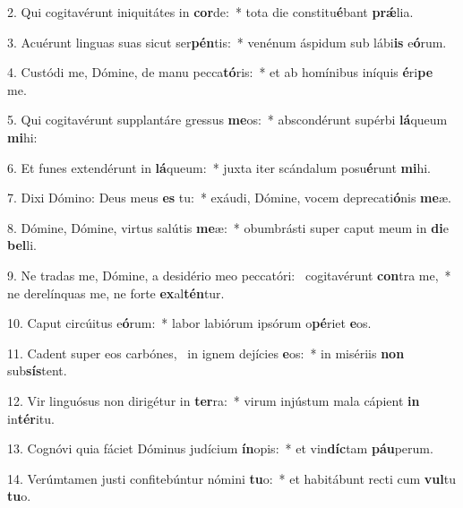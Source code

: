 2. Qui cogitavérunt iniquitátes in \textbf{cor}de:~*  tota die constitu\textbf{é}bant \textbf{prǽ}lia.\

3. Acuérunt linguas suas sicut ser\textbf{pén}tis:~*  venénum áspidum sub lábi\textbf{is} e\textbf{ó}rum.\

4. Custódi me, Dómine, de manu pecca\textbf{tó}ris:~*  et ab homínibus iníquis \textbf{é}ri\textbf{pe} me.\

5. Qui cogitavérunt supplantáre gressus \textbf{me}os:~*  abscondérunt supérbi \textbf{lá}queum \textbf{mi}hi:\

6. Et funes extendérunt in \textbf{lá}queum:~*  juxta iter scándalum posu\textbf{é}runt \textbf{mi}hi.\

7. Dixi Dómino: Deus meus \textbf{es} tu:~*  exáudi, Dómine, vocem deprecati\textbf{ó}nis \textbf{me}æ.\

8. Dómine, Dómine, virtus salútis \textbf{me}æ:~*  obumbrásti super caput meum in \textbf{di}e \textbf{bel}li.\

9. Ne tradas me, Dómine, a desidério meo peccatóri: \dag\  cogitavérunt \textbf{con}tra me,~*  ne derelínquas me, ne forte \textbf{ex}al\textbf{tén}tur.\

10. Caput circúitus e\textbf{ó}rum:~*  labor labiórum ipsórum o\textbf{pé}riet \textbf{e}os.\

11. Cadent super eos carbónes, \dag\  in ignem dejícies \textbf{e}os:~*  in misériis \textbf{non} sub\textbf{sís}tent.\

12. Vir linguósus non dirigétur in \textbf{ter}ra:~*  virum injústum mala cápient \textbf{in} in\textbf{tér}itu.\

13. Cognóvi quia fáciet Dóminus judícium \textbf{ín}opis:~*  et vin\textbf{díc}tam \textbf{páu}perum.\

14. Verúmtamen justi confitebúntur nómini \textbf{tu}o:~*  et habitábunt recti cum \textbf{vul}tu \textbf{tu}o.\

